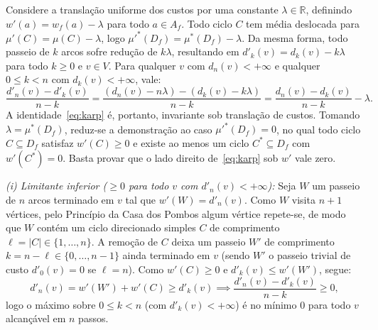 \begin{demonstracao}
Considere a translação uniforme dos custos por uma constante $\lambda \in \mathbb{R}$, definindo $w'(a) = w_f(a) - \lambda$ para todo $a \in A_f$. Todo ciclo $C$ tem média deslocada para $\mu'(C) = \mu(C) - \lambda$, logo $\mu'^*(D_f) = \mu^*(D_f) - \lambda$. Da mesma forma, todo passeio de $k$ arcos sofre redução de $k\lambda$, resultando em $d'_k(v) = d_k(v) - k\lambda$ para todo $k \ge 0$ e $v \in V$. Para qualquer $v$ com $d_n(v) < +\infty$ e qualquer $0 \le k < n$ com $d_k(v) < +\infty$, vale:
\begin{equation*}
    \frac{d'_n(v) - d'_k(v)}{n - k} = \frac{(d_n(v) - n\lambda) - (d_k(v) - k\lambda)}{n - k} = \frac{d_n(v) - d_k(v)}{n - k} - \lambda.
\end{equation*}
A identidade~\eqref{eq:karp} é, portanto, invariante sob translação de custos. Tomando $\lambda = \mu^*(D_f)$, reduz-se a demonstração ao caso $\mu'^*(D_f) = 0$, no qual todo ciclo $C \subseteq D_f$ satisfaz $w'(C) \ge 0$ e existe ao menos um ciclo $C^* \subseteq D_f$ com $w'(C^*) = 0$. Basta provar que o lado direito de~\eqref{eq:karp} sob $w'$ vale zero.

\medskip
\noindent \textit{(i) Limitante inferior ($\ge 0$ para todo $v$ com $d'_n(v) < +\infty$):}
Seja $W$ um passeio de $n$ arcos terminado em $v$ tal que $w'(W) = d'_n(v)$. Como $W$ visita $n + 1$ vértices, pelo Princípio da Casa dos Pombos algum vértice repete-se, de modo que $W$ contém um ciclo direcionado simples $C$ de comprimento $\ell = |C| \in \{1, \dots, n\}$. A remoção de $C$ deixa um passeio $W'$ de comprimento $k = n - \ell \in \{0, \dots, n-1\}$ ainda terminado em $v$ (sendo $W'$ o passeio trivial de custo $d'_0(v) = 0$ se $\ell = n$). Como $w'(C) \ge 0$ e $d'_k(v) \le w'(W')$, segue:
\begin{equation*}
    d'_n(v) = w'(W') + w'(C) \ge d'_k(v) \implies \frac{d'_n(v) - d'_k(v)}{n - k} \ge 0,
\end{equation*}
logo o máximo sobre $0 \le k < n$ (com $d'_k(v) < +\infty$) é no mínimo $0$ para todo $v$ alcançável em $n$ passos.


\end{demonstracao}
